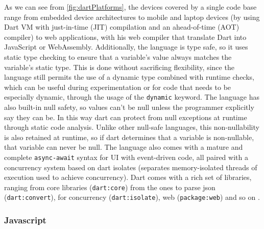 \noindent As we can see from \cref{fig:dartPlatforms}, the devices covered by a single code base range from embedded device architectures to mobile and laptop devices (by using Dart VM with just-in-time (JIT) compilation and an ahead-of-time (AOT) compiler) to web applications, with his web compiler that translate Dart into JavaScript or WebAssembly. Additionally, the language is type safe, so it uses static type checking to ensure that a variable's value always matches the variable's static type. This is done without sacrificing flexibility, since the language still permits the use of a dynamic type combined with runtime checks, which can be useful during experimentation or for code that needs to be especially dynamic, through the usage of the \texttt{dynamic} keyword. The language has also built-in null safety, so values can't be null unless the programmer explicitly say they can be. In this way dart can protect from null exceptions at runtime through static code analysis. Unlike other null-safe languages, this non-nullability is also retained at runtime, so if dart determines that a variable is non-nullable, that variable can never be null. The language also comes with a mature and complete \texttt{async-await} syntax for UI with event-driven code, all paired with a concurrency system based on dart isolates (separates memory-isolated threads of execution used to achieve concurrency). Dart comes with a rich set of libraries, ranging from core libraries (\texttt{dart:core}) from the ones to parse json (\texttt{dart:convert}), for concurrency (\texttt{dart:isolate}), web (\texttt{package:web}) and so on \cite{Dart}.

\subsubsection{Javascript}

